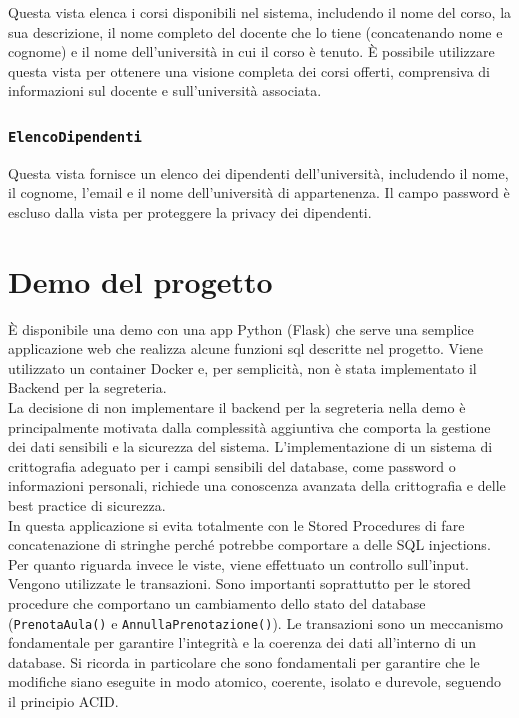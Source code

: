 \documentclass[a4paper, 10pt, oneside]{article} %
\begin{document}
Questa vista elenca i corsi disponibili nel sistema, includendo il nome del corso, la sua descrizione, il nome completo del docente che lo tiene (concatenando nome e cognome) e il nome dell'università in cui il corso è tenuto. È possibile utilizzare questa vista per ottenere una visione completa dei corsi offerti, comprensiva di informazioni sul docente e sull'università associata.

\subsubsection*{\texttt{ElencoDipendenti}}
Questa vista fornisce un elenco dei dipendenti dell'università, includendo il nome, il cognome, l'email e il nome dell'università di appartenenza. Il campo password è escluso dalla vista per proteggere la privacy dei dipendenti.



\section{Demo del progetto}
È disponibile una demo con una app Python (Flask) che serve una semplice applicazione web che realizza alcune funzioni sql descritte nel progetto. Viene utilizzato un container Docker e, per semplicità, non è stata implementato il Backend per la segreteria.\\

La decisione di non implementare il backend per la segreteria nella demo è principalmente motivata dalla complessità aggiuntiva che comporta la gestione dei dati sensibili e la sicurezza del sistema. L'implementazione di un sistema di crittografia adeguato per i campi sensibili del database, come password o informazioni personali, richiede una conoscenza avanzata della crittografia e delle best practice di sicurezza.\\

In questa applicazione si evita totalmente con le Stored Procedures di fare concatenazione di stringhe perché potrebbe comportare a delle SQL injections. Per quanto riguarda invece le viste, viene effettuato un controllo sull'input.\\

Vengono utilizzate le transazioni. Sono importanti soprattutto per le stored procedure che comportano un cambiamento dello stato del database (\texttt{PrenotaAula()} e \texttt{AnnullaPrenotazione()}). Le transazioni sono un meccanismo fondamentale per garantire l'integrità e la coerenza dei dati all'interno di un database. Si ricorda in particolare che sono fondamentali per garantire che le modifiche siano eseguite in modo atomico, coerente, isolato e durevole, seguendo il principio ACID.\\
\end{document}
